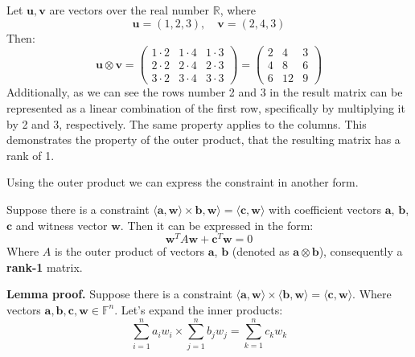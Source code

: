 \documentclass[../lecture-notes.tex]{subfiles}
\begin{document}
\begin{example}
    Let $\mathbf{u}, \mathbf{v}$ are vectors over the real number $\mathbb{R}$, where
    \begin{equation*}
        \mathbf{u} = (1, 2, 3), \quad \mathbf{v} = (2, 4, 3)
    \end{equation*}
    Then: 
    \begin{equation*}
        \mathbf{u} \otimes \mathbf{v} = \begin{pmatrix}
            1 \cdot 2 & 1 \cdot 4 & 1 \cdot 3 \\
            2 \cdot 2 & 2 \cdot 4 & 2 \cdot 3 \\
            3 \cdot 2 & 3 \cdot 4 & 3 \cdot 3
        \end{pmatrix} = \begin{pmatrix}
            2 & 4 & 3 \\
            4 & 8 & 6 \\
            6 & 12 & 9
        \end{pmatrix}
    \end{equation*}
    Additionally, as we can see the rows number 2 and 3 in the result matrix can be represented
    as a linear combination of the first row, specifically by multiplying it by 2 and 3, 
    respectively. The same property applies to the columns. This demonstrates the property of the
    outer product, that the resulting matrix has a rank of 1.
\end{example}

Using the outer product we can express the constraint in another form.

\begin{lemma}
    Suppose there is a constraint $\langle \mathbf{a}, \mathbf{w}\rangle \times \mathbf{b}, \mathbf{w}\rangle = \langle \mathbf{c}, \mathbf{w} \rangle$ 
    with coefficient vectors $\mathbf{a}$, $\mathbf{b}$, $\mathbf{c}$ and witness vector $\mathbf{w}$. Then it can be expressed in the 
    form:
    \[ \mathbf{w}^T A \mathbf{w} + \mathbf{c}^T \mathbf{w} = 0 \]
    Where $A$ is the outer product of vectors $\mathbf{a}$, $\mathbf{b}$ (denoted as $\mathbf{a} \otimes \mathbf{b}$), consequently 
    a \textbf{rank-1} matrix.
\end{lemma}

\textbf{Lemma proof.} Suppose there is a constraint $\langle \mathbf{a}, \mathbf{w}\rangle \times \langle \mathbf{b}, \mathbf{w}\rangle
= \langle \mathbf{c}, \mathbf{w}\rangle$. Where vectors $\mathbf{a}, \mathbf{b}, \mathbf{c}, \mathbf{w} \in \mathbb{F}^n $. Let's expand the inner
products: 
\[ \sum_{i=1}^{n} a_i w_i \times \sum_{j=1}^{n} b_j w_j = \sum_{k=1}^{n} c_k w_k \]
\end{document}
